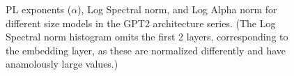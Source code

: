 \begin{figure}[t]
    \centering

    \caption{PL exponents ($\alpha$), Log Spectral norm, and Log Alpha norm for different size models in the GPT2 architecture series.  (The Log Spectral norm histogram omits the first 2 layers, corresponding to the embedding layer, as these are normalized differently and have anamolously large values.)}
    \label{fig:gpt2-histograms}
\end{figure}




